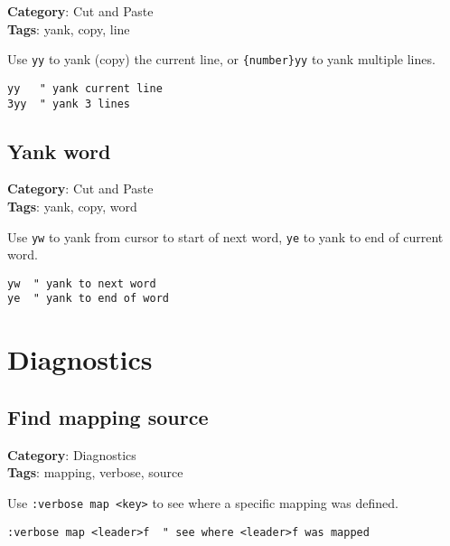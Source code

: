 {{{\textbf{Category}: Cut and Paste\\ \textbf{Tags}: yank, copy, line
\vspace{0.5cm}

Use {\footnotesize \Verb§yy§} to yank (copy) the current line, or {\footnotesize \Verb§{number}yy§} to yank multiple lines.

\begin{Exa*}{}
\begin{Verbatim}[fontsize=\footnotesize, breaklines, breakanywhere]
yy   " yank current line
3yy  " yank 3 lines
\end{Verbatim}
\end{Exa*}

\section{Yank word}

\textbf{Category}: Cut and Paste\\ \textbf{Tags}: yank, copy, word
\vspace{0.5cm}

Use {\footnotesize \Verb§yw§} to yank from cursor to start of next word, {\footnotesize \Verb§ye§} to yank to end of current word.

\begin{Exa*}{}
\begin{Verbatim}[fontsize=\footnotesize, breaklines, breakanywhere]
yw  " yank to next word
ye  " yank to end of word
\end{Verbatim}
\end{Exa*}

\chapter{Diagnostics}
\section{Find mapping source}

\textbf{Category}: Diagnostics\\ \textbf{Tags}: mapping, verbose, source
\vspace{0.5cm}

Use {\footnotesize \Verb§:verbose map <key>§} to see where a specific mapping was defined.

\begin{Exa*}{}
\begin{Verbatim}[fontsize=\footnotesize, breaklines, breakanywhere]
:verbose map <leader>f  " see where <leader>f was mapped
\end{Verbatim}
\end{Exa*}

}}}
